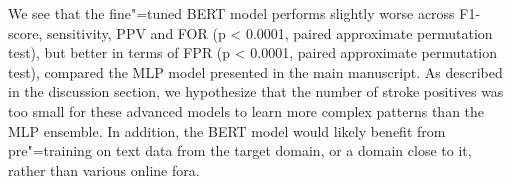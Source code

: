 {We see that the fine"=tuned BERT model performs slightly worse across F1-score, sensitivity, PPV and FOR (p < 0.0001, paired approximate permutation test), but better in terms of FPR (p < 0.0001, paired approximate permutation test), compared the MLP model presented in the main manuscript. As described in the discussion section, we hypothesize that the number of stroke positives was too small for these advanced models to learn more complex patterns than the MLP ensemble. In addition, the BERT model would likely benefit from pre"=training on text data from the target domain, or a domain close to it, rather than various online fora.

\begin{table}
    \centering
    \caption[Overall performance on MH-1813 test data for a fine"=tuned BERT model.]{Overall performance on MH-1813 test data for the fine-tuned BERT model described in the revised discussion of the paper. Includes performance of the call-takers and the multi-layer perceptron (MLP) from the main manuscript for ease of comparison [mean (95\% CI)]. NPV: negative predictive value, PPV: positive predictive value, FOR: false omission rate, CI: confidence interval.}
    \label{tab_retrospective:tableA8}
\end{table}}
